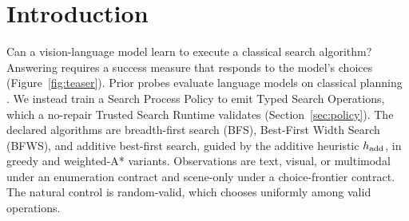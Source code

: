 \section{Introduction}
\label{sec:introduction}

Can a vision-language model learn to execute a classical search algorithm?
Answering requires a success measure that responds to the model's choices (Figure~\ref{fig:teaser}).
Prior probes evaluate language models on classical planning \citep{valmeekam2023critical,stein2025autoplanbench,kokel2026acpbenchhard}.
We instead train a Search Process Policy to emit Typed Search Operations, which a no-repair Trusted Search Runtime validates (Section~\ref{sec:policy}).
The declared algorithms are breadth-first search (BFS), Best-First Width Search (BFWS), and additive best-first search, guided by the additive heuristic $h_{\rm add}$, in greedy and weighted-A* variants.
Observations are text, visual, or multimodal under an enumeration contract and scene-only under a choice-frontier contract.
The natural control is random-valid, which chooses uniformly among valid operations.


